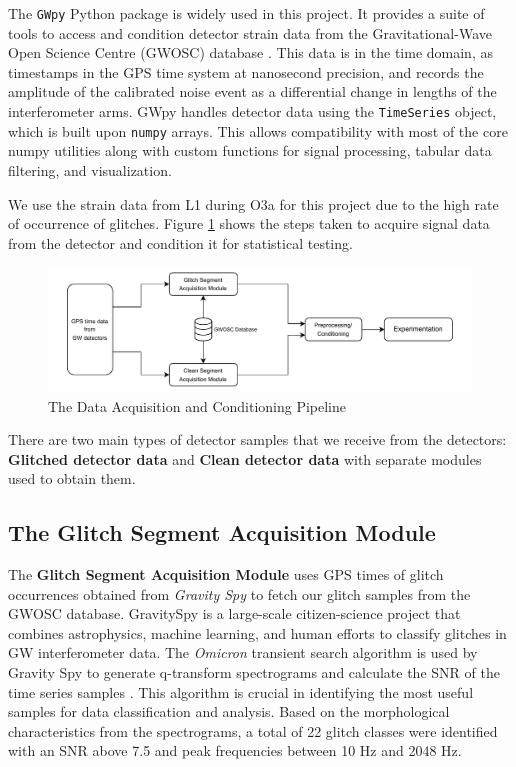 \documentclass[12pt]{article}
\begin{document}
\noindent The \texttt{GWpy} Python package is widely used in this project. It provides a suite of tools to access and condition detector strain data from the Gravitational-Wave Open Science Centre (GWOSC) database \cite{gwpy}. This data is in the time domain, as timestamps in the GPS time system at nanosecond precision, and records the amplitude of the calibrated noise event as a differential change in lengths of the interferometer arms. GWpy handles detector data using the \texttt{TimeSeries} object, which is built upon \texttt{numpy} arrays. This allows compatibility with most of the core numpy utilities along with custom functions for signal processing, tabular data filtering, and visualization.

\medskip
\noindent We use the strain data from L1 during O3a for this project due to the high rate of occurrence of glitches. Figure \ref{fig:data_acq_cond} shows the steps taken to acquire signal data from the detector and condition it for statistical testing.

\begin{figure}[H]
    \centering
    \includegraphics[width=\textwidth]{images/data_acquisition_preparation.pdf}
    \caption{The Data Acquisition and Conditioning Pipeline}
    \label{fig:data_acq_cond}
\end{figure}

\medskip
\noindent There are two main types of detector samples that we receive from the detectors: \textbf{Glitched detector data} and \textbf{Clean detector data} with separate modules used to obtain them.

\subsection{The Glitch Segment Acquisition Module}\label{Glitchdata}

\medskip
\noindent The \textbf{Glitch Segment Acquisition Module} uses GPS times of glitch occurrences obtained from \textit{Gravity Spy} \cite{Zevin_2017} to fetch our glitch samples from the GWOSC database. GravitySpy is a large-scale citizen-science project that combines astrophysics, machine learning, and human efforts to classify glitches in GW interferometer data. The \textit{Omicron} transient search algorithm is used by Gravity Spy to generate q-transform spectrograms and calculate the SNR of the time series samples \cite{robinet_omicron_2020}. This algorithm is crucial in identifying the most useful samples for data classification and analysis. Based on the morphological characteristics from the spectrograms, a total of 22 glitch classes were identified with an SNR above 7.5 and peak frequencies between 10 Hz and 2048 Hz.
\end{document}
